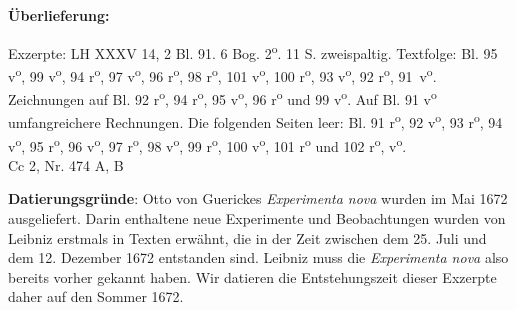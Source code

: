       
               
                \begin{ledgroupsized}[r]{120mm}
                \footnotesize 
                \pstart                
                \noindent\textbf{\"{U}berlieferung:}   
                \pend
                \end{ledgroupsized}
            
              
                            \begin{ledgroupsized}[r]{114mm}
                            \footnotesize 
                            \pstart \parindent -6mm
                            Exzerpte: LH XXXV 14, 2 Bl. 91. 6 Bog. 2\textsuperscript{o}. 11 S. zweispaltig. Textfolge: Bl. 95 v\textsuperscript{o}, 99 v\textsuperscript{o}, 94 r\textsuperscript{o}, 97 v\textsuperscript{o}, 96 r\textsuperscript{o}, 98 r\textsuperscript{o}, 101 v\textsuperscript{o}, 100 r\textsuperscript{o}, 93 v\textsuperscript{o}, 92 r\textsuperscript{o}, 91~v\textsuperscript{o}. Zeichnungen auf Bl. 92 r\textsuperscript{o}, 94 r\textsuperscript{o}, 95 v\textsuperscript{o}, 96 r\textsuperscript{o} und 99 v\textsuperscript{o}. Auf Bl. 91 v\textsuperscript{o} umfangreichere Rechnungen. Die folgenden Seiten leer: Bl. 91 r\textsuperscript{o}, 92 v\textsuperscript{o}, 93 r\textsuperscript{o}, 94 v\textsuperscript{o}, 95 r\textsuperscript{o}, 96 v\textsuperscript{o}, 97 r\textsuperscript{o}, 98 v\textsuperscript{o}, 99 r\textsuperscript{o}, 100 v\textsuperscript{o}, 101 r\textsuperscript{o} und 102 r\textsuperscript{o}, v\textsuperscript{o}.\\
 Cc 2, Nr. 474 A, B \pend
                            \end{ledgroupsized}
                \vspace*{5mm}
                \begin{ledgroup}
                \footnotesize 
                \pstart
            \noindent\footnotesize{\textbf{Datierungsgr\"{u}nde}: Otto von Guerickes \cite{00055}\textit{Experimenta nova} wurden im Mai 1672 ausgeliefert. Darin enthaltene neue Experimente und Beobachtungen wurden von Leibniz erstmals in Texten erw\"{a}hnt, die in der Zeit zwischen dem 25. Juli und dem 12. Dezember 1672 entstanden sind. Leibniz muss die \cite{00055}\textit{Experimenta nova} also bereits vorher gekannt haben. Wir datieren die Entstehungszeit dieser Exzerpte daher auf den Sommer 1672.}
                \pend
                \end{ledgroup}
            
